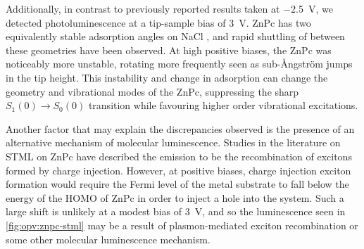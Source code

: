 
Additionally, in contrast to previously reported results taken at \SI{-2.5}{V}, we detected photoluminescence at a tip-sample bias of \SI{3}{V}. ZnPc has two equivalently stable adsorption angles on NaCl \citep{Miwa2016}, and rapid shuttling of between these geometries have been observed. At high positive biases, the ZnPc was noticeably more unstable, rotating more frequently seen as sub-\AA ngstr\"om jumps in the tip height. This instability and change in adsorption can change the geometry and vibrational modes of the ZnPc, suppressing the sharp $S_1(0) \rightarrow S_0(0)$ transition while favouring higher order vibrational excitations. 

Another factor that may explain the discrepancies observed is the presence of an alternative mechanism of molecular luminescence. Studies in the literature on \ac{STML} on ZnPc have described the emission to be the recombination of excitons formed by charge injection. However, at positive biases, charge injection exciton formation would require the Fermi level of the metal substrate to fall below the energy of the \ac{HOMO} of ZnPc in order to inject a hole into the system. Such a large shift is unlikely at a modest bias of \SI{3}{V}, and so the luminescence seen in \autoref{fig:opv:znpc-stml} may be a result of plasmon-mediated exciton recombination or some other molecular luminescence mechanism.










